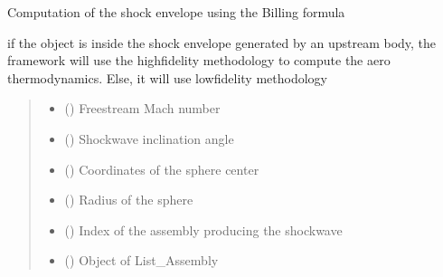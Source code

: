 \documentclass[letterpaper,10pt,english]{sphinxmanual}
\begin{document}
\begin{fulllineitems}
\label{\detokenize{modules:switch.compute_billig}}
\pysigstartsignatures
{}
\pysigstopsignatures
\sphinxAtStartPar
Computation of the shock envelope using the Billing formula

\sphinxAtStartPar
if the object is inside the shock envelope generated by an upstream body, the framework will use the high\sphinxhyphen{}fidelity methodology to compute the aero
thermodynamics. Else, it will use low\sphinxhyphen{}fidelity methodology
\begin{quote}\begin{description}
\begin{itemize}
\item {} 
\sphinxAtStartPar
{} () \textendash{} Freestream Mach number

\item {} 
\sphinxAtStartPar
{} () \textendash{} Shockwave inclination angle

\item {} 
\sphinxAtStartPar
{} (\sphinxstyleliteralemphasis{\sphinxupquote{(}}\sphinxstyleliteralemphasis{\sphinxupquote{)}}) \textendash{} Coordinates of the sphere center

\item {} 
\sphinxAtStartPar
{} () \textendash{} Radius of the sphere

\item {} 
\sphinxAtStartPar
{} () \textendash{} Index of the assembly producing the shockwave

\item {} 
\sphinxAtStartPar
{} () \textendash{} Object of List\_Assembly


\end{itemize}
\end{description}
\end{quote}
\end{fulllineitems}
\end{document}
